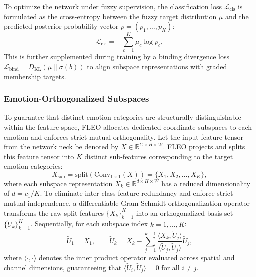 To optimize the network under fuzzy supervision, the classification loss $\mathcal{L}_{\text{cls}}$ is formulated as the cross-entropy between the fuzzy target distribution $\mu$ and the predicted posterior probability vector $p = (p_1, \dots, p_K)$:
\begin{equation}
\mathcal{L}_{\text{cls}} = -\sum_{c=1}^{K} \mu_c \log p_c,
\label{eq:fuzzy_loss}
\end{equation}
 This is further supplemented during training by a binding divergence loss $\mathcal{L}_{\text{bind}} = D_{\text{KL}}(\mu \parallel \sigma(b))$ to align subspace representations with graded membership targets.

\subsubsection{Emotion-Orthogonalized Subspaces}

To guarantee that distinct emotion categories are structurally distinguishable within the feature space, FLEO allocates dedicated coordinate subspaces to each emotion and enforces strict mutual orthogonality. Let the input feature tensor from the network neck be denoted by $X \in \mathbb{R}^{C \times H \times W}$. FLEO projects and splits this feature tensor into $K$ distinct sub-features corresponding to the target emotion categories:
\begin{equation}
X_{\text{sub}} = \text{split}\left(\text{Conv}_{1\times1}(X)\right) = \{X_1, X_2, \dots, X_K\},
\label{eq:subspace_split}
\end{equation}
where each subspace representation $X_k \in \mathbb{R}^{d \times H \times W}$ has a reduced dimensionality of $d = c_1/K$.  To eliminate inter-class feature redundancy and enforce strict mutual independence, a differentiable Gram-Schmidt orthogonalization operator transforms the raw split features $\{X_k\}_{k=1}^{K}$ into an orthogonalized basis set $\{\tilde{U}_k\}_{k=1}^{K}$. Sequentially, for each subspace index $k = 1, \dots, K$:
\begin{equation}
\tilde{U}_1 = X_1, \qquad \tilde{U}_k = X_k - \sum_{j=1}^{k-1} \frac{\langle X_k, \tilde{U}_j \rangle}{\langle \tilde{U}_j, \tilde{U}_j \rangle} \tilde{U}_j,
\label{eq:gram_schmidt}
\end{equation}
where $\langle \cdot, \cdot \rangle$ denotes the inner product operator evaluated across spatial and channel dimensions, guaranteeing that $\langle \tilde{U}_i, \tilde{U}_j \rangle = 0$ for all $i \neq j$. 

